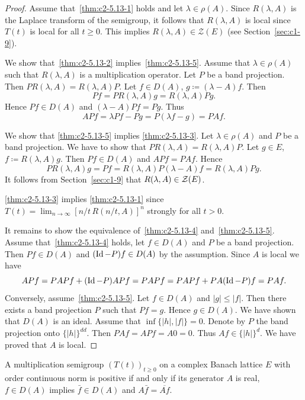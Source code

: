 \begin{proof}
Assume that~\ref{thm:c2-5.13-1}   holds and let $\lambda \in \rho(A)$.
Since $R(\lambda,A)$ is the Laplace transform of the semigroup, it follows that $R(\lambda,A)$ is local since $T(t)$ is local for all $t \geq 0$.
This implies $R(\lambda,A) \in \mathcal{Z}(E)$ (see Section~\ref{sec:c1-9}).

We show that~\ref{thm:c2-5.13-2}   implies~\ref{thm:c2-5.13-5}.
Assume that $\lambda \in \rho(A)$ such that $R(\lambda,A)$ is a multiplication operator.
Let $P$ be a band projection.
Then $PR(\lambda,A) = R(\lambda,A)P$.
Let $f \in D(A)$, $g \coloneq (\lambda-A)f$.
Then 
\[
Pf = PR(\lambda,A)g = R(\lambda,A)Pg .
\]
Hence $Pf \in D(A)$ and $(\lambda-A)Pf = Pg$.
Thus 
\[
APf= \lambda Pf - Pg = P(\lambda f - g) = PAf .
\]

We show that \ref{thm:c2-5.13-5}   implies \ref{thm:c2-5.13-3}.
Let $\lambda \in \rho(A)$ and $P$ be a band projection.
We have to show that $PR(\lambda,A) = R(\lambda,A)P$.
Let $g \in E$, $f \coloneq R(\lambda,A)g$.
Then $Pf \in D(A)$ and $APf = PAf$.
Hence 
\[
PR(\lambda,A)g = Pf = R(\lambda,A)P(\lambda-A)f = R(\lambda,A)Pg .
\]
It follows from Section~\ref{sec:c1-9} 
that $R(\lambda,A) \in \mathcal{Z}(E)$.

\ref{thm:c2-5.13-3}   implies \ref{thm:c2-5.13-1}   since $T(t) = \lim_{n \to \infty} [n/t\,R(n/t,A)]^{n}$ strongly for all $t > 0$.

It remains to show the equivalence of~\ref{thm:c2-5.13-4}   and~\ref{thm:c2-5.13-5}.
Assume that~\ref{thm:c2-5.13-4}   holds, let $f \in D(A)$ and $P$ be a band projection.
Then $Pf \in D(A)$ and $(\operatorname{Id}-P)f \in D(A)$ by the assumption.
Since $A$ is local we have 
\[
APf = PAPf + (\operatorname{Id}-P)APf = PAPf = PAPf + PA(\operatorname{Id}-P)f = PAf.
\]
Conversely, assume~\ref{thm:c2-5.13-5}.
Let $f \in D(A)$ and $|g| \leq |f|$.
Then there exists a band projection $P$ such that $Pf = g$.
Hence $g \in D(A)$.
We have shown
that $D(A)$ is an ideal.
Assume that $\inf\{|h|,|f|\} = 0$.
Denote by $P$ the band projection onto $\{|h|\}^{dd}$.
Then $PAf = APf = A0 = 0$.
Thus $Af \in \{|h|\}^{d}$.
We have proved that $A$ is local.
\end{proof}
\begin{corollary}\label{cor:c2-5.14}
%
A multiplication semigroup $(T(t))_{t \geq 0}$ on a complex Banach lattice $E$ with order continuous norm is positive if and only if its generator $A$ is real, \ie $f \in D(A)$ implies $\bar{f} \in D(A)$ and $A\bar{f} = \overline{Af}$.
\end{corollary}
